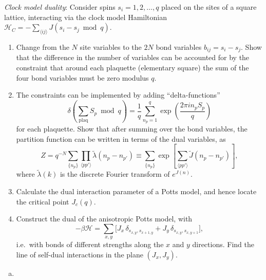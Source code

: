 \begin{problem}
    \textit{Clock model duality}: Consider spins $s_i = 1, 2, \ldots, q$ placed on the sites of a square lattice, interacting via the clock model Hamiltonian $\mathcal{H}_C = -\sum_{\langle ij\rangle}J(s_i - s_j \bmod q)$.

    \begin{enumerate}
        \item[(a)] Change from the $N$ site variables to the $2N$ bond variables $b_{ij} = s_i - s_j$. Show that the difference in the number of variables can be accounted for by the constraint that around each plaquette (elementary square) the sum of the four bond variables must be zero modulus $q$.

        \item[(b)] The constraints can be implemented by adding ``delta-functions''
        \[
            \delta\!\left(\sum_{\text{plaq}} S_p \bmod q\right) = \frac{1}{q}\sum_{n_p=1}^{q}\exp\!\left(\frac{2\pi i n_p S_p}{q}\right)
        \]
        for each plaquette. Show that after summing over the bond variables, the partition function can be written in terms of the dual variables, as
        \[
            Z = q^{-N}\sum_{\{n_p\}}\prod_{\langle pp'\rangle}\tilde{\lambda}(n_p - n_{p'}) \equiv \sum_{\{n_p\}}\exp\!\left[\sum_{\langle pp'\rangle}\tilde{J}(n_p - n_{p'})\right],
        \]
        where $\tilde{\lambda}(k)$ is the discrete Fourier transform of $e^{J(n)}$.

        \item[(c)] Calculate the dual interaction parameter of a Potts model, and hence locate the critical point $J_c(q)$.

        \item[(d)] Construct the dual of the anisotropic Potts model, with
        \[
            -\beta\mathcal{H} = \sum_{x,y}\bigl[J_x\,\delta_{s_{x,y},s_{x+1,y}} + J_y\,\delta_{s_{x,y},s_{x,y+1}}\bigr],
        \]
        i.e.\ with bonds of different strengths along the $x$ and $y$ directions. Find the line of self-dual interactions in the plane $(J_x, J_y)$.
    \end{enumerate}
\end{problem}

\begin{solution}
    \begin{enumerate}[(a)]
        \item
    \end{enumerate}
\end{solution}

